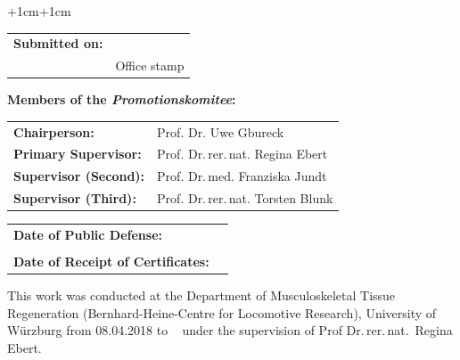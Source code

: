 \begin{adjustwidth}{+1cm}{+1cm} %

    \noindent
    \begin{tabular}{l l}
        \textbf{Submitted on:} & \dotuline{\hspace{10cm}} \\
                               & {\small Office stamp}    \\
    \end{tabular}


    \vspace{\vdouble}
    {\noindent\large \textbf{Members of the \textit{Promotionskomitee}:}}

    \vspace{\vhalf}
    \begin{tabular}{l l}
        \textbf{Chairperson:}         & Prof. Dr. Uwe Gbureck                \\
        \textbf{Primary Supervisor:}  & Prof. Dr.\,rer.\,nat. Regina Ebert  \\
        \textbf{Supervisor (Second):} & Prof. Dr.\,med. Franziska Jundt    \\
        \textbf{Supervisor (Third):}  & Prof. Dr.\,rer.\,nat. Torsten Blunk \\
    \end{tabular}


    \vspace{\vdouble}
    \noindent
    \begin{tabular}{l l}
        \textbf{Date of Public Defense:}          & \dotuline{\hspace{6.45cm}} \\
                                                  &                            \\
        \textbf{Date of Receipt of Certificates:} & \dotuline{\hspace{6.45cm}} \\
    \end{tabular}

\end{adjustwidth}

\thispagestyle{empty} %


\newpage


\vspace*{\fill} %
\noindent
This work was conducted at the Department of Musculoskeletal Tissue
Regeneration (Bernhard-Heine-Centre for Locomotive Research), University
of Würzburg from 08.04.2018 to 
\DTMtoday~ under the supervision of Prof Dr.\,rer.\,nat.~Regina Ebert.

\thispagestyle{empty} %